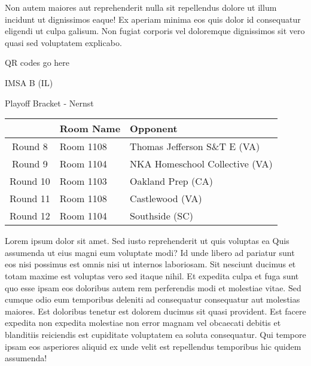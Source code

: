 \documentclass{article}%
\begin{document}
\newline%
Non autem maiores aut reprehenderit nulla sit repellendus dolore ut illum incidunt ut dignissimos eaque! Ex aperiam minima eos quis dolor id consequatur eligendi ut culpa galisum. Non fugiat corporis vel doloremque dignissimos sit vero quasi sed voluptatem explicabo.\newline%
\newline%
%
\vspace*{30pt}%
\begin{center}%
\begin{Huge}%
QR codes go here%
\end{Huge}%
\end{center}%
\newpage%
\begin{center}%
\begin{Huge}%
IMSA B (IL)%
\end{Huge}%
\vspace*{8pt}%
\linebreak%
\begin{Large}%
Playoff Bracket {-} Nernst%
\end{Large}%
\end{center}%
\begin{tabularx}{\textwidth}{|c|Y|Y|}%
\hline%
&Room Name&Opponent\\%
\hline%
Round 8&Room 1108&Thomas Jefferson S\&T E (VA)\\%
Round 9&Room 1104&NKA Homeschool Collective (VA)\\%
Round 10&Room 1103&Oakland Prep (CA)\\%
Round 11&Room 1108&Castlewood (VA)\\%
Round 12&Room 1104&Southside (SC)\\%
\hline%
\end{tabularx}%
\vspace*{8pt}%
\linebreak%
\newline%
\newline%
Lorem ipsum dolor sit amet. Sed iusto reprehenderit ut quis voluptas ea Quis assumenda ut eius magni eum voluptate modi? Id unde libero ad pariatur sunt eos nisi possimus est omnis nisi ut internos laboriosam. Sit nesciunt ducimus et totam maxime est voluptas vero sed itaque nihil. Et expedita culpa et fuga sunt quo esse ipsam eos doloribus autem rem perferendis modi et molestiae vitae.\newline%
\newline%
Sed cumque odio eum temporibus deleniti ad consequatur consequatur aut molestias maiores. Est doloribus tenetur est dolorem ducimus sit quasi provident. Est facere expedita non expedita molestiae non error magnam vel obcaecati debitis et blanditiis reiciendis est cupiditate voluptatem ea soluta consequatur. Qui tempore ipsam eos asperiores aliquid ex unde velit est repellendus temporibus hic quidem assumenda!\newline%
\end{document}
